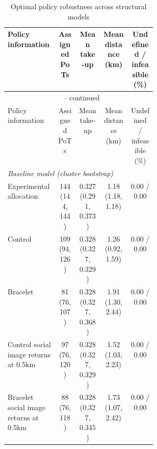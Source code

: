 \small
\begin{longtable}{p{0.34\linewidth}cccc}
\caption{Optimal policy robustness across structural models}\label{tab:policy-model-robustness}\\
\toprule
Policy information & \makecell{Assigned\\PoTs} & \makecell{Mean\\take-up} & \makecell{Mean distance\\(km)} & \makecell{Undefined /\\infeasible (\%)} \\
\midrule
\endfirsthead
\multicolumn{5}{c}{\tablename\ \thetable{} -- continued} \\
\toprule
Policy information & \makecell{Assigned\\PoTs} & \makecell{Mean\\take-up} & \makecell{Mean distance\\(km)} & \makecell{Undefined /\\infeasible (\%)} \\
\midrule
\endhead
\multicolumn{5}{l}{\textit{Baseline model (cluster bootstrap)}} \\
Experimental allocation & \makecell[c]{144\\(144, 144)} & \makecell[c]{0.327\\(0.291, 0.373)} & \makecell[c]{1.18\\(1.18, 1.18)} & 0.00 / 0.00 \\
Control & \makecell[c]{109\\(94, 126)} & \makecell[c]{0.328\\(0.327, 0.329)} & \makecell[c]{1.26\\(0.92, 1.59)} & 0.00 / 0.00 \\
Bracelet & \makecell[c]{81\\(76, 107)} & \makecell[c]{0.328\\(0.327, 0.368)} & \makecell[c]{1.91\\(1.30, 2.44)} & 0.00 / 0.00 \\
Control social image returns at 0.5km & \makecell[c]{97\\(76, 120)} & \makecell[c]{0.328\\(0.327, 0.329)} & \makecell[c]{1.52\\(1.03, 2.23)} & 0.00 / 0.00 \\
Bracelet social image returns at 0.5km & \makecell[c]{88\\(76, 118)} & \makecell[c]{0.328\\(0.327, 0.345)} & \makecell[c]{1.73\\(1.07, 2.42)} & 0.00 / 0.00 \\

\end{longtable}

